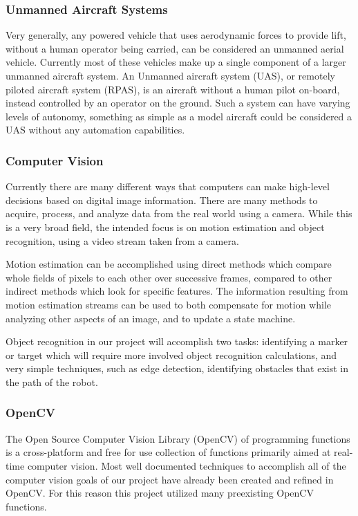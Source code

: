 \documentclass{article}[12]
\begin{document}
		\subsubsection{Unmanned Aircraft Systems}
		
		Very generally, any powered vehicle that uses aerodynamic forces to provide lift, without a human operator being carried, can be considered an unmanned aerial vehicle. Currently most of these vehicles make up a single component of a larger unmanned aircraft system. An Unmanned aircraft system (UAS), or remotely piloted aircraft system (RPAS), is an aircraft without a human pilot on-board, instead controlled by an operator on the ground. Such a system can have varying levels of autonomy, something as simple as a model aircraft could be considered a UAS without any automation capabilities.\cite{RPAS}
		
		\subsubsection{Computer Vision}
		
		Currently there are many different ways that computers can make high-level decisions based on digital image information. There are many methods to acquire, process, and analyze data from the real world using a camera. While this is a very broad field, the intended focus is on motion estimation and object recognition, using a video stream taken from a camera. 
		
		Motion estimation can be accomplished using direct methods which compare whole fields of pixels to each other over successive frames, compared to other indirect methods which look for specific features. The information resulting from motion estimation streams can be used to both compensate for motion while analyzing other aspects of an image, and to update a state machine.
		
		Object recognition in our project will accomplish two tasks: identifying a marker or target which will require more involved object recognition calculations, and very simple techniques, such as edge detection, identifying obstacles that exist in the path of the robot.
		
		\subsubsection{OpenCV}
		
		The Open Source Computer Vision Library (OpenCV) of programming functions is a cross-platform and free for use collection of functions primarily aimed at real-time computer vision\cite{opencv}. Most well documented techniques to accomplish all of the computer vision goals of our project have already been created and refined in OpenCV.\cite{woods2015dynamic} For this reason this project utilized many preexisting OpenCV functions.
		
\end{document}

